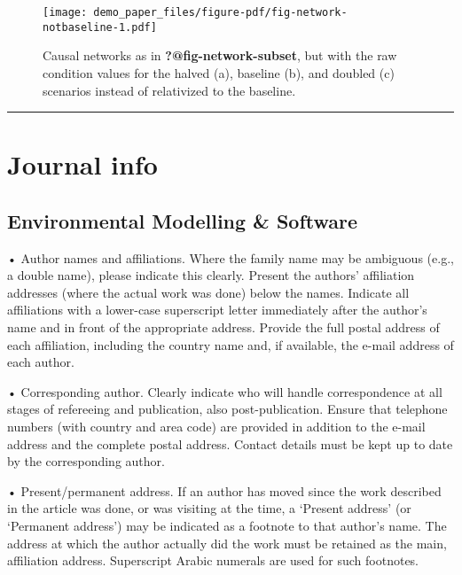 \documentclass[
  number]{elsarticle}
\begin{document}
\begin{figure}

{\centering \texttt{[image: demo\_paper\_files/figure-pdf/fig-network-notbaseline-1.pdf]}

}

\caption{\label{fig-network-notbaseline}Causal networks as in
\textbf{?@fig-network-subset}, but with the raw condition values for the
halved (a), baseline (b), and doubled (c) scenarios instead of
relativized to the baseline.}

\end{figure}

\begin{center}\rule{0.5\linewidth}{0.5pt}\end{center}

\hypertarget{journal-info}{%
\section{Journal info}\label{journal-info}}

\hypertarget{environmental-modelling-software}{%
\subsection{Environmental Modelling \&
Software}\label{environmental-modelling-software}}

• Author names and affiliations. Where the family name may be ambiguous
(e.g., a double name), please indicate this clearly. Present the
authors' affiliation addresses (where the actual work was done) below
the names. Indicate all affiliations with a lower-case superscript
letter immediately after the author's name and in front of the
appropriate address. Provide the full postal address of each
affiliation, including the country name and, if available, the e-mail
address of each author.

• Corresponding author. Clearly indicate who will handle correspondence
at all stages of refereeing and publication, also post-publication.
Ensure that telephone numbers (with country and area code) are provided
in addition to the e-mail address and the complete postal address.
Contact details must be kept up to date by the corresponding author.

• Present/permanent address. If an author has moved since the work
described in the article was done, or was visiting at the time, a
`Present address' (or `Permanent address') may be indicated as a
footnote to that author's name. The address at which the author actually
did the work must be retained as the main, affiliation address.
Superscript Arabic numerals are used for such footnotes.
\end{document}
